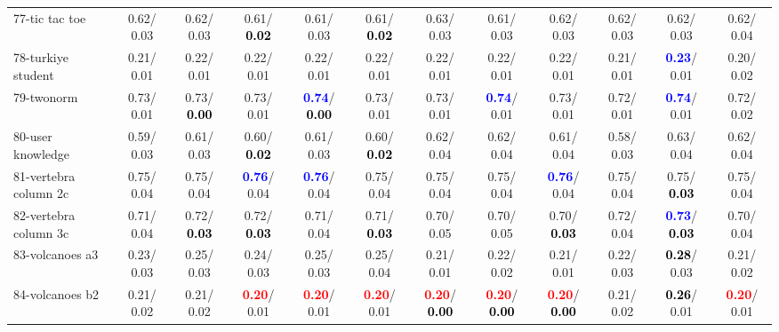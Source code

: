 \begin{table}[h]
\begin{center}
{\begin{tabular}{lc|c|c|c|c|c|c|c|c|c|c}
77-tic tac toe &   0.62/  0.03 &   0.62/  0.03 &   0.61/\textcolor{black}{\textbf{  0.02}} &   0.61/  0.03 &   0.61/\textcolor{black}{\textbf{  0.02}} &   0.63/  0.03 &   0.61/  0.03 &   0.62/  0.03 &   0.62/  0.03 &   0.62/  0.03 &   0.62/  0.04 \\
78-turkiye student &   0.21/  0.01 &   0.22/  0.01 &   0.22/  0.01 &   0.22/  0.01 &   0.22/  0.01 &   0.22/  0.01 &   0.22/  0.01 &   0.22/  0.01 &   0.21/  0.01 & \textcolor{blue}{\textbf{  0.23}}/  0.01 &   0.20/  0.02 \\ \hline
79-twonorm &   0.73/  0.01 &   0.73/\textcolor{black}{\textbf{  0.00}} &   0.73/  0.01 & \textcolor{blue}{\textbf{  0.74}}/\textcolor{black}{\textbf{  0.00}} &   0.73/  0.01 &   0.73/  0.01 & \textcolor{blue}{\textbf{  0.74}}/  0.01 &   0.73/  0.01 &   0.72/  0.01 & \textcolor{blue}{\textbf{  0.74}}/  0.01 &   0.72/  0.02 \\
80-user knowledge &   0.59/  0.03 &   0.61/  0.03 &   0.60/\textcolor{black}{\textbf{  0.02}} &   0.61/  0.03 &   0.60/\textcolor{black}{\textbf{  0.02}} &   0.62/  0.04 &   0.62/  0.04 &   0.61/  0.04 &   0.58/  0.03 &   0.63/  0.04 &   0.62/  0.04 \\
81-vertebra column 2c &   0.75/  0.04 &   0.75/  0.04 & \textcolor{blue}{\textbf{  0.76}}/  0.04 & \textcolor{blue}{\textbf{  0.76}}/  0.04 &   0.75/  0.04 &   0.75/  0.04 &   0.75/  0.04 & \textcolor{blue}{\textbf{  0.76}}/  0.04 &   0.75/  0.04 &   0.75/\textcolor{black}{\textbf{  0.03}} &   0.75/  0.04 \\
82-vertebra column 3c &   0.71/  0.04 &   0.72/\textcolor{black}{\textbf{  0.03}} &   0.72/\textcolor{black}{\textbf{  0.03}} &   0.71/  0.04 &   0.71/\textcolor{black}{\textbf{  0.03}} &   0.70/  0.05 &   0.70/  0.05 &   0.70/\textcolor{black}{\textbf{  0.03}} &   0.72/  0.04 & \textcolor{blue}{\textbf{  0.73}}/\textcolor{black}{\textbf{  0.03}} &   0.70/  0.04 \\
83-volcanoes a3 &   0.23/  0.03 &   0.25/  0.03 &   0.24/  0.03 &   0.25/  0.03 &   0.25/  0.04 &   0.21/  0.01 &   0.22/  0.02 &   0.21/  0.01 &   0.22/  0.03 & \textcolor{black}{\textbf{  0.28}}/  0.03 &   0.21/  0.02 \\
84-volcanoes b2 &   0.21/  0.02 &   0.21/  0.02 & \textcolor{red}{\textbf{  0.20}}/  0.01 & \textcolor{red}{\textbf{  0.20}}/  0.01 & \textcolor{red}{\textbf{  0.20}}/  0.01 & \textcolor{red}{\textbf{  0.20}}/\textcolor{black}{\textbf{  0.00}} & \textcolor{red}{\textbf{  0.20}}/\textcolor{black}{\textbf{  0.00}} & \textcolor{red}{\textbf{  0.20}}/\textcolor{black}{\textbf{  0.00}} &   0.21/  0.02 & \textcolor{black}{\textbf{  0.26}}/  0.01 & \textcolor{red}{\textbf{  0.20}}/  0.01 \\

\end{tabular}}
\end{center}
\end{table}
